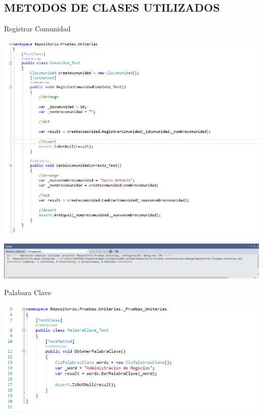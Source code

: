 \subsection{METODOS DE CLASES UTILIZADOS}


 Registrar Comunidad



\begin{center}
\includegraphics[width=18cm]{./Imagenes/prueba1}
\end{center}


\begin{center}
\includegraphics[width=18cm]{./Imagenes/prueba11}
\end{center}

\item
 Palabara Clave
\begin{center}
\includegraphics[width=18cm]{./Imagenes/prueba2}
\end{center}


